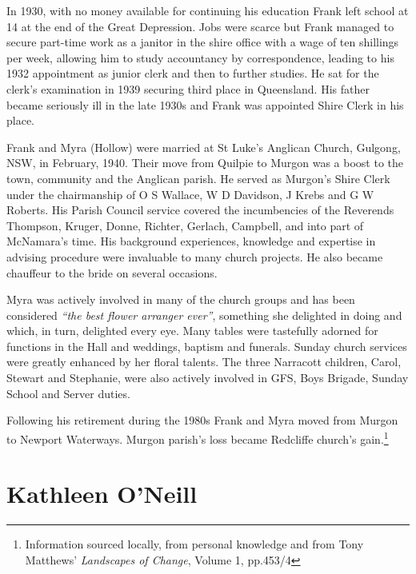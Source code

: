 In 1930, with no money available for continuing his education Frank left school at 14 at the end of the Great Depression. Jobs were scarce but Frank managed to secure part-time work as a janitor in the shire office with a wage of ten shillings per week, allowing him to study accountancy by correspondence, leading to his 1932 appointment as junior clerk and then to further studies. He sat for the clerk's examination in 1939 securing third place in Queensland. His father became seriously ill in the late 1930s and Frank was appointed Shire Clerk in his place.



Frank and Myra (Hollow) were married at St Luke's Anglican Church, Gulgong, NSW, in February, 1940. Their move from Quilpie to Murgon was a boost to the town, community and the Anglican parish. He served as Murgon's Shire Clerk under the chairmanship of O S Wallace, W D Davidson, J Krebs and G W Roberts. His Parish Council service covered the incumbencies of the Reverends Thompson, Kruger, Donne, Richter, Gerlach, Campbell, and into part of McNamara's time. His background experiences, knowledge and expertise in advising procedure were invaluable to many church projects. He also became chauffeur to the bride on several occasions.



Myra was actively involved in many of the church groups and has been considered \emph{``the best flower arranger ever''}, something she delighted in doing and which, in turn, delighted every eye. Many tables were tastefully adorned for functions in the Hall and weddings, baptism and funerals. Sunday church services were greatly enhanced by her floral talents. The three Narracott children, Carol, Stewart and Stephanie, were also actively involved in GFS, Boys Brigade, Sunday School and Server duties.



Following his retirement during the 1980s Frank and Myra moved from Murgon to Newport Waterways. Murgon parish's loss became Redcliffe church's gain.\footnote{Information sourced locally, from personal knowledge and from Tony Matthews' \emph{Landscapes of Change}, Volume 1, pp.453/4}


\section{Kathleen O'Neill}



